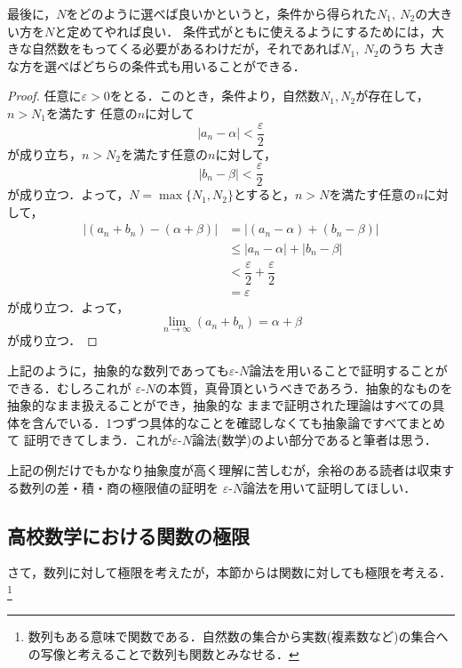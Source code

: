 \documentclass[a4paper,12pt,autodetect-engine,dvipdfmx]{jsarticle}
\theoremstyle{definition}
\begin{document}
最後に，$N$をどのように選べば良いかというと，条件から得られた$N_{1},\ N_{2}$の大きい方を$N$と定めてやれば良い．
条件式がともに使えるようにするためには，大きな自然数をもってくる必要があるわけだが，それであれば$N_{1},\ N_{2}$のうち
大きな方を選べばどちらの条件式も用いることができる．

\begin{proof}
    任意に$\varepsilon > 0$をとる．このとき，条件より，自然数$N_{1}, N_{2}$が存在して，$n>N_{1}$を満たす
    任意の$n$に対して
    $$\left|a_{n} - \alpha\right| < \dfrac{\varepsilon}{2}$$
    が成り立ち，$n>N_{2}$を満たす任意の$n$に対して，
    $$\left|b_{n} - \beta\right| < \dfrac{\varepsilon}{2}$$
    が成り立つ．よって，$N=\max \{N_{1}, N_{2}\}$とすると，$n>N$を満たす任意の$n$に対して，
    \begin{align*}
        \left|(a_{n} + b_{n}) - (\alpha + \beta)\right| &= \left|(a_{n}- \alpha) + (b_{n} - \beta)\right|\\
                                                    &\leq |a_{n} - \alpha| + |b_{n} - \beta|\\
                                                    &< \dfrac{\varepsilon}{2} + \dfrac{\varepsilon}{2}\\
                                                    &=\varepsilon
    \end{align*}
    が成り立つ．よって，
    $$\lim_{n \to \infty}(a_{n} + b_{n}) = \alpha + \beta$$
    が成り立つ．
\end{proof}
上記のように，抽象的な数列であっても$\varepsilon$-$N$論法を用いることで証明することができる．むしろこれが
$\varepsilon$-$N$の本質，真骨頂というべきであろう．抽象的なものを抽象的なまま扱えることができ，抽象的な
ままで証明された理論はすべての具体を含んでいる．1つずつ具体的なことを確認しなくても抽象論ですべてまとめて
証明できてしまう．これが$\varepsilon$-$N$論法(数学)のよい部分であると筆者は思う．

上記の例だけでもかなり抽象度が高く理解に苦しむが，余裕のある読者は収束する数列の差・積・商の極限値の証明を
$\varepsilon$-$N$論法を用いて証明してほしい．

\subsection{高校数学における関数の極限}
さて，数列に対して極限を考えたが，本節からは関数に対しても極限を考える．\footnote{数列もある意味で関数である．自然数の集合から実数(複素数など)の集合への写像と考えることで数列も関数とみなせる．}
\end{document}
